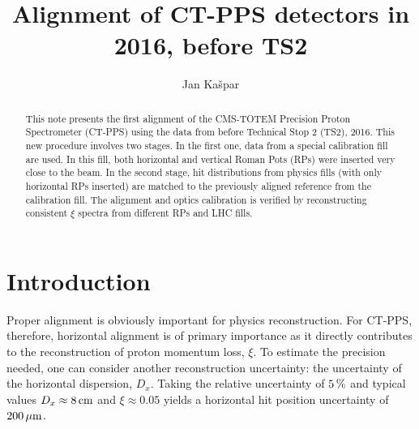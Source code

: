 \documentclass[TOTEM]{cern/cernphprep}
\def\un#1{\,{\rm #1}}
\begin{document}
\begin{titlepage}

\renewcommand{\EXPLOGO}{fig/logo_totem_black.pdf}

\PHnumber{}
\PHdate{}


\title{Alignment of CT-PPS detectors in 2016, before TS2}


\author{Jan Ka\v spar}


\begin{abstract}
This note presents the first alignment of the CMS-TOTEM Precision Proton Spectrometer (CT-PPS) using the data from before Technical Stop 2 (TS2), 2016. This new procedure involves two stages. In the first one, data from a special calibration fill are used. In this fill, both horizontal and vertical Roman Pots (RPs) were inserted very close to the beam. In the second stage, hit distributions from physics fills (with only horizontal RPs inserted) are matched to the previously aligned reference from the calibration fill. The alignment and optics calibration is verified by reconstructing consistent $\xi$ spectra from different RPs and LHC fills.
\end{abstract}


\end{titlepage}


\linenumbers

\section{Introduction}
\label{s:intro}

Proper alignment is obviously important for physics reconstruction. For CT-PPS, therefore, horizontal alignment is of primary importance as it directly contributes to the reconstruction of proton momentum loss, $\xi$. To estimate the precision needed, one can consider another reconstruction uncertainty: the uncertainty of the horizontal dispersion, $D_x$. Taking the relative uncertainty of $5\un{\%}$ \cite{optics_calibration} and typical values $D_x \approx 8\un{cm}$ and $\xi \approx 0.05$ yields a horizontal hit position uncertainty of $200\un{\mu m}$.
\end{document}

